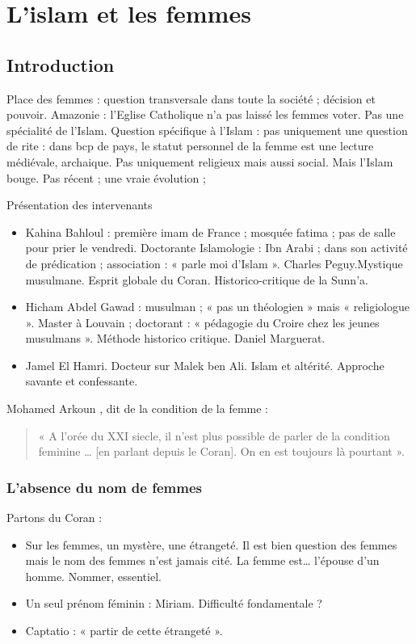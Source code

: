 \chapter{L’islam et les femmes}


\section{Introduction}
 
Place des femmes : question transversale dans toute la société ; décision et pouvoir. Amazonie : l’Eglise Catholique n’a pas laissé les femmes voter. Pas une spécialité de l’Islam.
Question spécifique à l’Islam : pas uniquement une question de rite : dans bcp de pays, le statut personnel de la femme est une lecture médiévale, archaique. Pas uniquement religieux mais aussi social.
Mais l’Islam bouge. Pas récent ; une vraie évolution ; 

 

Présentation des intervenants
\begin{itemize}
    \item Kahina Bahloul : première imam de France ; mosquée fatima ; pas de salle pour prier le vendredi. Doctorante Islamologie : Ibn Arabi ; dans son activité de prédication ; association : « parle moi d’Islam ». Charles Peguy.Mystique musulmane. Esprit globale du Coran. Historico-critique de la Sunn’a. 
    \item Hicham Abdel Gawad : musulman ; « pas un théologien » mais « religiologue ». Master à Louvain ; doctorant : « pédagogie du Croire chez les jeunes musulmans ». Méthode historico critique.  Daniel Marguerat. 
    \item Jamel El Hamri. Docteur sur Malek ben Ali. Islam et altérité. Approche savante et confessante. 
\end{itemize}






 Mohamed Arkoun \label{theol:Arkoun1},
dit de la condition de la femme  :
\begin{quote}
    « A l’orée du XXI siecle, il n’est plus possible de parler de la condition feminine … [en parlant depuis le Coran]. On en est toujours là pourtant ».
\end{quote}


\subsection{L’absence du nom de femmes}
Partons du Coran : 
\begin{itemize}
    \item 	Sur les femmes, un mystère, une étrangeté. Il est bien question des femmes mais le nom des femmes n’est jamais cité. La femme est… l’épouse d’un homme. Nommer, essentiel. 
\item	Un seul prénom féminin : Miriam. Difficulté fondamentale ? 
\item	Captatio : « partir de cette étrangeté ».

\end{itemize}

